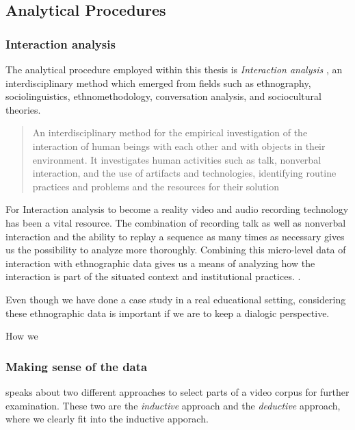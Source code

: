 \subsection{Analytical Procedures}
\subsubsection{Interaction analysis}
The analytical procedure employed within this thesis is \emph{Interaction analysis} \citep{jordan1995interaction}, an interdisciplinary method which emerged from fields such as ethnography, sociolinguistics, ethnomethodology, conversation analysis, and sociocultural theories. 

\begin{quote}
An interdisciplinary method for the empirical investigation of the interaction of human
beings with each other and with objects in their environment. It investigates human
activities such as talk, nonverbal interaction, and the use of artifacts and technologies,
identifying routine practices and problems and the resources for their solution \citep[p39]{jordan1995interaction}
\end{quote}

For Interaction analysis to become a reality video and audio recording technology has been a vital resource. The combination of recording talk as well as nonverbal interaction and the ability to replay a sequence as many times as necessary gives us the possibility to analyze more thoroughly. Combining this micro-level data of interaction with ethnographic data gives us a means of analyzing how the interaction is part of the situated context and institutional practices. \citep{furberg2009scientific}. 

Even though we have done a case study in a real educational setting, considering these ethnographic data is important if we are to keep a dialogic perspective. 

How we 


\subsubsection{Making sense of the data}
\citeauthor{derry2010conducting} speaks about two different approaches to select parts of a video corpus for further examination. These two are the \emph{inductive} approach and the \emph{deductive} approach, where we clearly fit into the inductive apporach.

